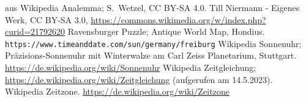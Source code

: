\begin{thebibliography}{99}
 aus Wikipedia \glqq Analemma\grqq; S.\ Wetzel, CC BY-SA 4.0.
 Till Niermann - Eigenes Werk, CC BY-SA 3.0, 
                \url{https://commons.wikimedia.org/w/index.php?curid=21792620}
 Ravensburger Puzzle; Antique World Map, Hondius.                 
   {\small \verb+https://www.timeanddate.com/sun/germany/freiburg+} 
 Wikipedia \glqq Sonnenuhr\grqq; 
           Pr\"azisions-Sonnenuhr mit Winterwalze am Carl Zeiss Planetarium, Stuttgart.
           \url{https://de.wikipedia.org/wiki/Sonnenuhr}   
 Wikipedia \glqq Zeitgleichung\grqq; 
                 \url{https://de.wikipedia.org/wiki/Zeitgleichung} (aufgerufen am 14.5.2023).
 Wikipedia \glqq Zeitzone\grqq. \url{https://de.wikipedia.org/wiki/Zeitzone}
\end{thebibliography}


%

